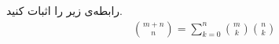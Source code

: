 \documentclass[12pt,onecolumn,a4paper]{article}
\begin{document}
رابطه‌ی زیر را اثبات کنید.
        \begin{align*}
       \binom{m + n}{n} = \sum\limits_{k=0}^{n} \binom{m}{k} \binom{n}{k}
        \end{align*}
\end{document}
